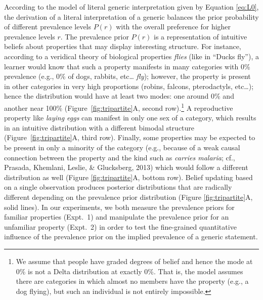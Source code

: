 \documentclass[floatsintext,doc]{apa6}
\let\rmarkdownfootnote\footnote%
\def\footnote{\protect\rmarkdownfootnote}
\begin{document}
According to the model of literal generic interpretation given by Equation \ref{eq:L0}, the derivation of a literal interpretation of a generic balances the prior probability of different prevalence levels \(P(r)\) with the overall preference for higher prevalence levels \(r\). %
The prevalence prior \(P(r)\) is a representation of intuitive beliefs about properties that may display interesting structure.
For instance, according to a veridical theory of biological properties \emph{flies} (like in ``Ducks fly''), a learner would know that such a property manifests in many categories with 0\% prevalence (e.g., 0\% of dogs, rabbits, etc\ldots{} \emph{fly}); however, the property is present in other categories in very high proportions (robins, falcons, pterodactyls, etc\ldots{}); hence the distribution would have at least two modes: one around 0\% and another near 100\% (Figure~\ref{fig:tripartite}A, second row).\footnote{
	We assume that people have graded degrees of belief and hence the mode at 0\% is not a Delta distribution at exactly 0\%. That is, the model assumes there are categories in which almost no members have the property (e.g., a dog flying), but such an individual is not entirely impossible.}
A reproductive property like \emph{laying eggs} can manifest in only one sex of a category, which results in an intuitive distribution with a different bimodal structure (Figure~\ref{fig:tripartite}A, third row).  
Finally, some properties may be expected to be present in only a minority of the category (e.g., because of a weak causal connection between the property and the kind such as \emph{carries malaria}; cf., Prasada, Khemlani, Leslie, \& Glucksberg, 2013) which would follow a different distribution as well (Figure \ref{fig:tripartite}A, bottom row). 
Belief updating based on a single observation produces posterior distributions that are radically different depending on the prevalence prior distribution  (Figure \ref{fig:tripartite}A, solid lines).
In our experiments, we both measure the prevalence priors for familiar properties  (Expt.~1) and manipulate the prevalence prior for an unfamiliar property (Expt.~2) in order to test the fine-grained quantitative influence of the prevalence prior on the implied prevalence of a generic statement. 
\end{document}
